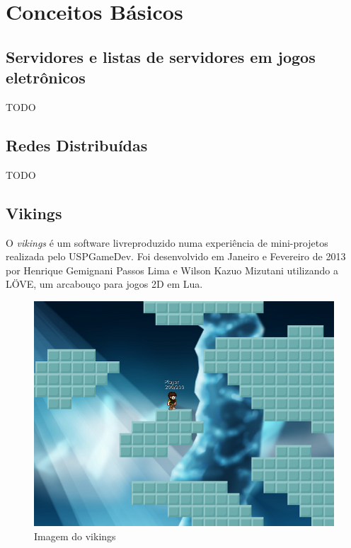 \chapter{Conceitos Básicos}
\label{sec:conceitos}

\section{Servidores e listas de servidores em jogos eletrônicos}
\label{sec:conceitos:servidores}
    TODO

\section{Redes Distribuídas}
\label{sec:conceitos:redes}
    TODO

\section{Vikings}
\label{sec:conceitos:vikings}
  O \textit{vikings} é um software livre\footnotemark produzido numa experiência de mini-projetos realizada pelo USPGameDev\footnotemark. 
  Foi desenvolvido em Janeiro e Fevereiro de 2013 por Henrique Gemignani Passos Lima e Wilson Kazuo Mizutani 
  utilizando a LÖVE, um arcabouço para jogos 2D em Lua.
  
  \begin{figure}
    \includegraphics{imagens/vikings-1.png}
    \caption{Imagem do vikings}
  \end{figure}


